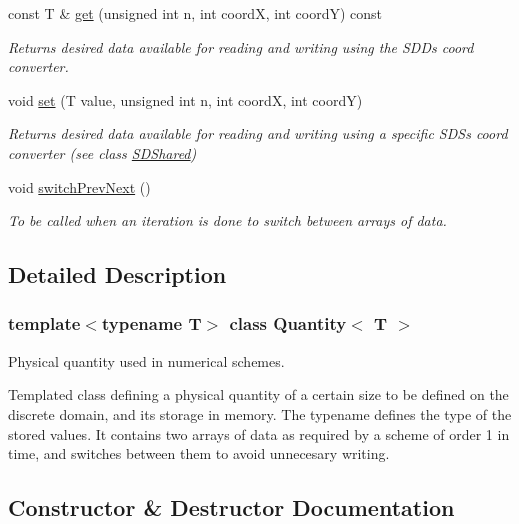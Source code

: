 \begin{DoxyCompactItemize}
const T \& \hyperlink{classQuantity_afca0ff888e70a2916ffad26e1709f9ea}{get} (unsigned int n, int coordX, int coordY) const
\begin{DoxyCompactList}\small\item\em Returns desired data available for reading and writing using the S\+DD\textquotesingle{}s coord converter. \end{DoxyCompactList}\item 
void \hyperlink{classQuantity_a10c68498d1dfe59535a6f07c0627c8d4}{set} (T value, unsigned int n, int coordX, int coordY)
\begin{DoxyCompactList}\small\item\em Returns desired data available for reading and writing using a specific S\+DS\textquotesingle{}s coord converter (see class \hyperlink{classSDShared}{S\+D\+Shared}) \end{DoxyCompactList}\item 
\mbox{\label{classQuantity_af0799b7702ab9c7724399a6d76a41ea9}} 
void \hyperlink{classQuantity_af0799b7702ab9c7724399a6d76a41ea9}{switch\+Prev\+Next} ()
\begin{DoxyCompactList}\small\item\em To be called when an iteration is done to switch between arrays of data. \end{DoxyCompactList}\end{DoxyCompactItemize}


\subsection{Detailed Description}
\subsubsection*{template$<$typename T$>$\newline
class Quantity$<$ T $>$}

Physical quantity used in numerical schemes. 

Templated class defining a physical quantity of a certain size to be defined on the discrete domain, and its storage in memory. The typename defines the type of the stored values. It contains two arrays of data as required by a scheme of order 1 in time, and switches between them to avoid unnecesary writing. 

\subsection{Constructor \& Destructor Documentation}
\mbox{\label{classQuantity_ab07b278cfe453e82756684b1730efc95}} 
